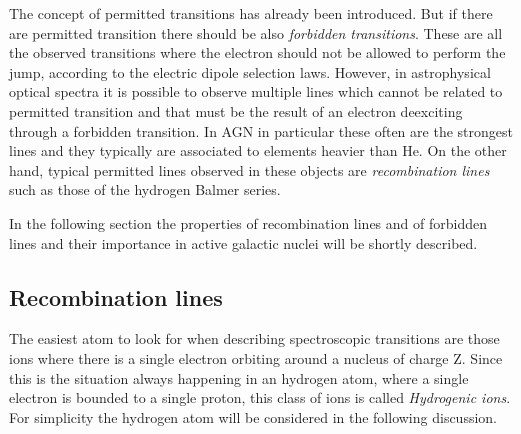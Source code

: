 \documentclass[../main.tex]{subfiles}
\begin{document}
The concept of permitted transitions has already been introduced.
But if there are permitted transition there should be also \emph{forbidden transitions}.
These are all the observed transitions where the electron should not be allowed to perform the jump, according to the electric dipole selection laws.
However, in astrophysical optical spectra it is possible to observe multiple lines which cannot be related to permitted transition and that must be the result of an electron deexciting through a forbidden transition.
In AGN in particular these often are the strongest lines and they typically are associated to elements heavier than He.
On the other hand, typical permitted lines observed in these objects are \emph{recombination lines} such as those of the hydrogen Balmer series.

In the following section the properties of recombination lines and of forbidden lines and their importance in active galactic nuclei will be shortly described.

\subsection{Recombination lines}

The easiest atom to look for when describing spectroscopic transitions are those ions where 
there is a single electron orbiting around a nucleus of charge Z.
Since this is the situation always happening in an hydrogen atom, where a single electron is bounded to a single proton, this class of ions is called \emph{Hydrogenic ions}.
For simplicity the hydrogen atom will be considered in the following discussion.
\end{document}
